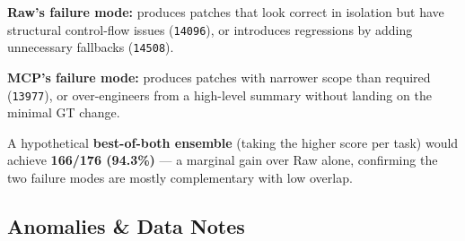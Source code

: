 \noindent
\textbf{Raw's failure mode:} produces patches that look correct in
isolation but have structural control-flow issues (\texttt{14096}), or
introduces regressions by adding unnecessary fallbacks
(\texttt{14508}).

\textbf{MCP's failure mode:} produces patches with narrower scope
than required (\texttt{13977}), or over-engineers from a high-level
summary without landing on the minimal GT change.

A hypothetical \textbf{best-of-both ensemble} (taking the higher score
per task) would achieve \textbf{166/176 (94.3\%)} --- a marginal
gain over Raw alone, confirming the two failure modes are mostly
complementary with low overlap.

\subsection{Anomalies \& Data Notes}\label{sec:anomalies-sonnet}

